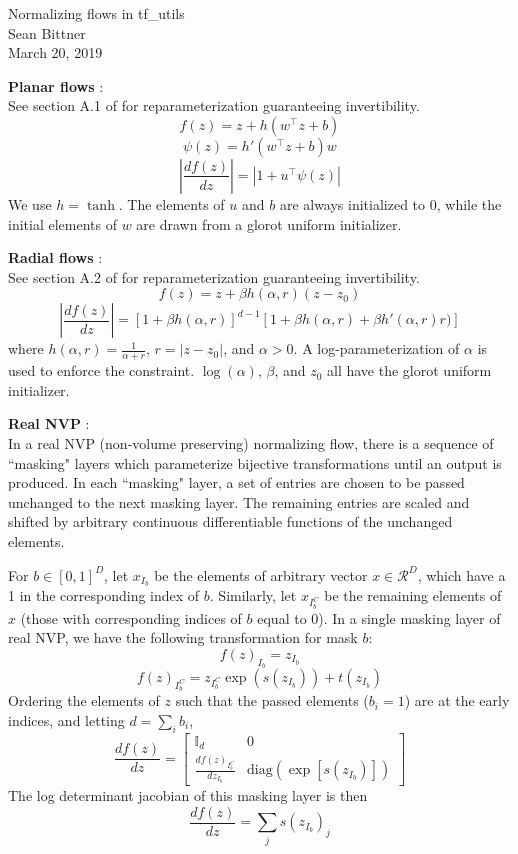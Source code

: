 \documentclass[11pt]{article}
\begin{document}
\medskip                        %

\thispagestyle{plain}
\begin{center}                  %
{\Large Normalizing flows in tf\_utils} \\
Sean Bittner \\
March 20, 2019 \\
\end{center}

\textbf{Planar flows} \cite{rezende2015variational}: \\
See section A.1 of \cite{rezende2015variational} for reparameterization guaranteeing invertibility.
\[f(z) = z + h(w^\top z + b)\]
\[\psi(z) = h'(w^\top z + b)w \]
\[ \left| \frac{d f(z)}{dz} \right| =  \left| 1 + u^\top \psi (z) \right| \]
We use $h = \tanh$.  The elements of $u$ and $b$ are always initialized to $0$, while the initial elements of $w$ are drawn from a glorot uniform initializer.

\textbf{Radial flows} \cite{rezende2015variational}: \\
See section A.2 of \cite{rezende2015variational} for reparameterization guaranteeing invertibility.
\[f(z) = z + \beta h(\alpha, r) (z - z_0) \]
\[ \left| \frac{d f(z)}{dz} \right| = \left[1 + \beta h(\alpha, r)\right]^{d-1} \left[ 1 + \beta h(\alpha, r) + \beta h'(\alpha, r)r) \right] \]
where $h(\alpha, r) = \frac{1}{\alpha + r}$, $r = \left| z - z_0 \right|$, and $\alpha > 0$.  A log-parameterization of $\alpha$ is used to enforce the constraint.  $\log(\alpha)$, $\beta$, and $z_0$ all have the glorot uniform initializer.

\textbf{Real NVP} \cite{dinh2016density}: \\
In a real NVP (non-volume preserving) normalizing flow, there is a sequence of ``masking" layers which parameterize bijective transformations until an output is produced.  In each ``masking" layer, a set of entries are chosen to be passed unchanged to the next masking layer.  The remaining entries are scaled and shifted by arbitrary continuous differentiable functions of the unchanged elements.

For $b \in \left[0, 1\right]^D$, let $x_{I_b}$ be the elements of arbitrary vector $x \in \mathcal{R}^D$, which have a 1 in the corresponding index of $b$.  Similarly, let $x_{I_b^C}$ be the remaining elements of $x$ (those with corresponding indices of $b$ equal to 0).  In a single masking layer of real NVP, we have the following transformation for mask $b$:
\[f(z)_{I_b} = z_{I_b}\]
\[f(z)_{I_b^C} = z_{I_b^C} \exp(s(z_{I_b})) + t(z_{I_b}) \]
Ordering the elements of $z$ such that the passed elements ($b_i=1$) are at the early indices, and letting $d = \sum_i b_i$, 
\[\frac{d f(z)}{d z} = \begin{bmatrix} \mathbb{I}_d & 0 \\ \frac{d f(z)_{I_b^C}}{d z_{I_b}} & \text{diag} (\exp \left[s(z_{I_b}) \right]) \end{bmatrix} \]
The log determinant jacobian of this masking layer is then
\[ \frac{d f(z)}{d z} = \sum_j s(z_{I_b})_j \]
\end{document}
